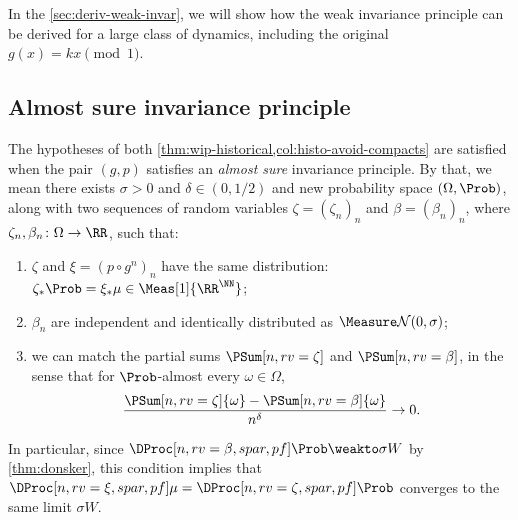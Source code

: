 \documentclass[../main]{subfiles}
\begin{document}
In the \cref{sec:deriv-weak-invar}, we will show how the weak invariance principle can be derived for a large class of dynamics, including the original \(g(x) = kx \pmod 1\).






\subsection{Almost sure invariance principle}

The hypotheses of both \cref{thm:wip-historical,col:histo-avoid-compacts} are satisfied when the pair \((g,p)\) satisfies an \emph{almost sure} invariance principle. By that, we mean there exists \(\sigma > 0\) and \(\delta \in (0,1/2)\) and new probability space \((\Omega,\Prob)\), along with two sequences of random variables \(\zeta = (\zeta_n)_n\) and \(\beta = (\beta_n)_n\), where \(\zeta_n, \beta_n \colon \Omega \to \RR\), such that:
\begin{enumerate}
\item \label{item:1}\(\zeta\) and \(\xi = (p \circ g^n)_n\) have the same distribution: \(\zeta_*\Prob = \xi_*\mu \in \Meas[1]{\RR^{\NN}}\);
\item \(\beta_n\) are independent and identically distributed as \(\Normal[0][\sigma]\);
\item \label{item:3}we can match the partial sums \(\PSum[n,rv = \zeta]\) and \(\PSum[n,rv = \beta]\), in the sense that for \(\Prob\)-almost every \(\omega \in \Omega\),
  \begin{equation*}
    \frac{\PSum[n,rv = \zeta]{\omega} - \PSum[n,rv = \beta]{\omega}}{n^{\delta}} \to 0.
  \end{equation*}
\end{enumerate}
In particular, since \(\DProc[n,rv = \beta,spar,pf]\Prob \weakto \sigma W\) by \cref{thm:donsker}, this condition implies that \(\DProc[n,rv = \xi,spar,pf]\mu = \DProc[n,rv = \zeta,spar,pf]\Prob\) converges to the same limit \(\sigma W\).
\end{document}

